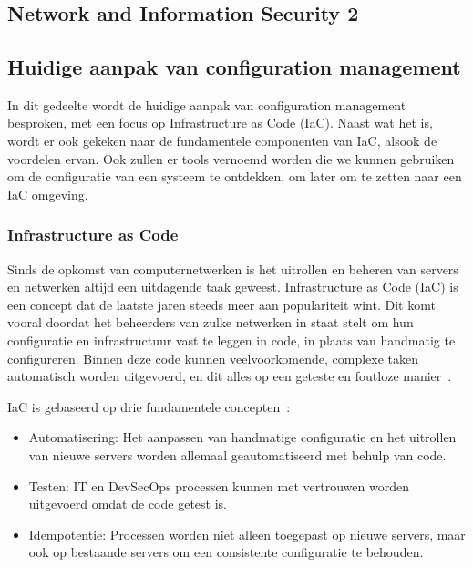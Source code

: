 \chapter{}%
\label{ch:stand-van-zaken}



\section{Network and Information Security 2}%
\label{sec:nis2}

\section{Huidige aanpak van configuration management}%
\label{sec:huidige-aanpak-van-configuration-management}

In dit gedeelte wordt de huidige aanpak van configuration management besproken, met een focus op Infrastructure as Code (IaC).
Naast wat het is, wordt er ook gekeken naar de fundamentele componenten van IaC, alsook de voordelen ervan.
Ook zullen er tools vernoemd worden die we kunnen gebruiken om de configuratie van een systeem te ontdekken, om later om te zetten naar een IaC omgeving.

\subsection{Infrastructure as Code}%
\label{sub:iac}

Sinds de opkomst van computernetwerken is het uitrollen en beheren van servers en netwerken altijd een uitdagende taak geweest.
Infrastructure as Code (IaC) is een concept dat de laatste jaren steeds meer aan populariteit wint. Dit komt vooral doordat het beheerders van zulke netwerken in staat stelt om hun configuratie en infrastructuur vast te leggen in code, in plaats van handmatig te configureren.
Binnen deze code kunnen veelvoorkomende, complexe taken automatisch worden uitgevoerd, en dit alles op een geteste en foutloze manier~\autocite{chef-what-is-iac}.

IaC is gebaseerd op drie fundamentele concepten~\autocite{chef-what-is-iac}:
\begin{itemize}
    \item Automatisering: Het aanpassen van handmatige configuratie en het uitrollen van nieuwe servers worden allemaal geautomatiseerd met behulp van code.
    \item Testen: IT en DevSecOps processen kunnen met vertrouwen worden uitgevoerd omdat de code getest is.
    \item Idempotentie: Processen worden niet alleen toegepast op nieuwe servers, maar ook op bestaande servers om een consistente configuratie te behouden.
\end{itemize}


